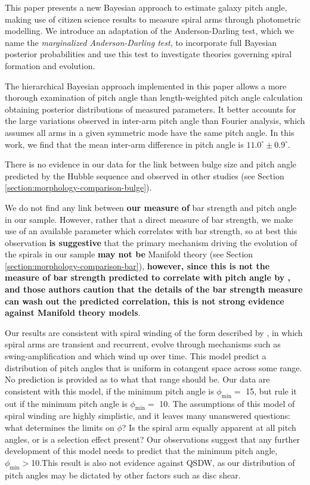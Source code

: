 \label{section:summary}
This paper presents a new Bayesian approach to estimate galaxy pitch angle, making use of citizen science results to measure spiral arms through photometric modelling. We introduce an adaptation of the Anderson-Darling test, which we name the \textit{marginalized Anderson-Darling test}, to incorporate full Bayesian posterior probabilities and use this test to investigate theories governing spiral formation and evolution.

The hierarchical Bayesian approach implemented in this paper allows a more thorough examination of pitch angle than length-weighted pitch angle calculation obtaining posterior distributions of measured parameters. It better accounts for the large variations observed in inter-arm pitch angle than Fourier analysis, which assumes all arms in a given symmetric mode have the same pitch angle. In this work, we find that the mean inter-arm difference in pitch angle is $11.0^\circ\pm 0.9^\circ$.

There is no evidence in our data for the link between bulge size and pitch angle predicted by the Hubble sequence and observed in other studies (see Section \ref{section:morphology-comparison-bulge}).

We do not find any link between {\bf our measure of} bar strength and pitch angle in our sample. However, rather that a direct measure of bar strength, we make use of an available parameter which correlates with bar strength, so at best this observation {\bf is suggestive} that the primary mechanism driving the evolution of the spirals in our sample {\bf may not be} Manifold theory (see Section \ref{section:morphology-comparison-bar}), \textbf{however, since this is not the measure of bar strength predicted to correlate with pitch angle by \citet{2009MNRAS.400.1706A}, and those authors caution that the details of the bar strength measure can wash out the predicted correlation, this is not strong evidence against Manifold theory models}. 

Our results are consistent with spiral winding of the form described by \citet{2019arXiv190910291P}, in which spiral arms are transient and recurrent, evolve through mechanisms such as swing-amplification \citep{1965MNRAS.130..125G} and which wind up over time. This model predict a distribution of pitch angles that is uniform in cotangent space across some range. No prediction is provided as to what that range should be. Our data are consistent with this model, if the minimum pitch angle is $\phi_\mathrm{min} = $ {15\degree}, but rule it out if the minimum pitch angle is $\phi_\mathrm{min} = $ {10\degree}. The assumptions of this model of spiral winding are highly simplistic, and it leaves many unanswered questions: what determines the limits on $\phi$? Is the spiral arm equally apparent at all pitch angles, or is a selection effect present? Our observations suggest that any further development of this model needs to predict that the minimum pitch angle, $\phi_\mathrm{min}>${10\degree}.This result is also not evidence against QSDW, as our distribution of pitch angles may be dictated by other factors such as disc shear.

